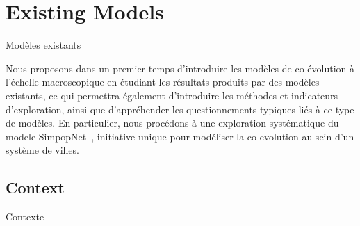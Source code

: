 




\newpage


\section[Existing Models][Modèles existants]{Existing Models}{Modèles existants}

\label{sec:macrocoevolexplo}



Nous proposons dans un premier temps d'introduire les modèles de co-évolution à l'échelle macroscopique en étudiant les résultats produits par des modèles existants, ce qui permettra également d'introduire les méthodes et indicateurs d'exploration, ainsi que d'appréhender les questionnements typiques liés à ce type de modèles. En particulier, nous procédons à une exploration systématique du modele SimpopNet~\cite{schmitt2014modelisation}, initiative unique pour modéliser la co-evolution au sein d'un système de villes.



\subsection{Context}{Contexte}


